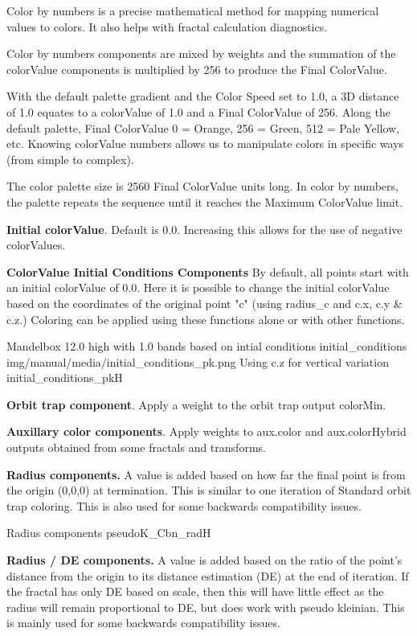Color by numbers is a precise mathematical method for mapping numerical values to colors. It also helps with fractal calculation diagnostics.

Color by numbers components are mixed by weights and the summation of the colorValue components is multiplied by 256 to produce the Final ColorValue.

With the default palette gradient and the Color Speed set to 1.0, a 3D distance of 1.0 equates to a colorValue of 1.0 and a Final ColorValue of 256. Along the default palette, Final ColorValue 0 = Orange, 256 = Green, 512 = Pale Yellow, etc.
Knowing colorValue numbers allows us to manipulate colors in specific ways (from simple to complex).

The color palette size is 2560 Final ColorValue units long. In color by numbers, the palette repeats the sequence until it reaches the Maximum ColorValue limit.

\textbf{Initial colorValue}. Default is 0.0. Increasing this allows for the use of negative colorValues.

\textbf{ColorValue Initial Conditions Components}
By default, all points start with an initial colorValue of 0.0. Here it is possible to change the initial colorValue based on the coordinates of the original point "c" (using radius\_c and c.x, c.y \& c.z.) Coloring can be applied using these functions alone or with other functions.

{Mandelbox 12.0 high with 1.0 bands based on intial conditions}
{initial_conditions}
{img/manual/media/initial_conditions_pk.png}
{Using c.z for vertical variation}
{initial_conditions_pk}{H}

\textbf{Orbit trap component}. Apply a weight to the orbit trap output colorMin.

\textbf{Auxillary color components}. Apply weights to aux.color and aux.colorHybrid outputs obtained from some fractals and transforms.

\textbf{Radius components.} A value is added based on how far the final point is from the origin (0,0,0) at termination.
This is similar to one iteration of Standard orbit trap coloring. This is also used for some backwards compatibility issues.

{Radius components}
{pseudoK_Cbn_rad}{H}

\textbf{Radius / DE components.} A value is added based on the ratio of the point's distance from the origin to its distance estimation (DE) at the end of iteration. If the fractal has only DE based on scale, then this will have little effect as the radius will remain proportional to DE, but does work with pseudo kleinian. This is mainly used for some backwards compatibility issues.


